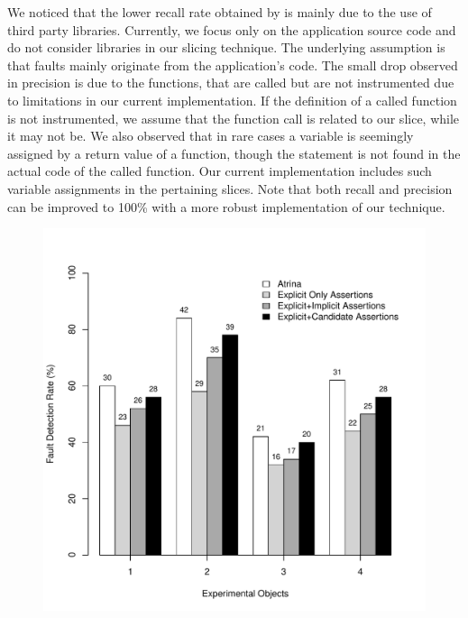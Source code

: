 We noticed that the lower recall rate obtained by \tool is mainly due to the use of third party libraries. Currently, we focus only on the application source code and do not consider libraries in our slicing technique. The underlying assumption is that faults mainly originate from the application's code. The small drop observed in precision is due to the functions, that are called but are not instrumented due to limitations in our current implementation. If the definition of a called function is not instrumented, we assume that the function call is related to our slice, while it may not be. We also observed that in rare cases a variable is seemingly assigned by a return value of a function, though the  statement is not found in the actual code of the called function. Our current implementation includes such variable assignments in the pertaining slices. Note that both recall and precision can be improved to 100\% with a more robust implementation of our technique. 

\begin{figure}[!t]
  \centering
  \includegraphics[width=1\hsize]{r-scripts/assertionTypeFaultDetec}
  \vspace{-0.18in} 
  \vspace{-0.1in} 
  \label{Fig:assertionTypeFaultDetec} 
\end{figure}
